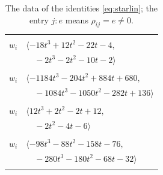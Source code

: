 \documentclass[11pt]{article}
\begin{document}
\begingroup\scriptsize
\setlength{\LTcapwidth}{\textwidth}
\begin{longtable}{@{}ll@{}}
\caption{The data of the identities \eqref{eq:starlin}; the entry $j{:}e$ means $\rho_{ij}=e\neq0$.}\label{tab:star}\\
\hline\endfirsthead\hline\endhead\hline\endfoot
\multicolumn{2}{@{}p{0.97\textwidth}@{}}{$i=0$, $D_i=8$, $\rho_{ij}$: $6{:}1, \allowbreak 7{:}2, \allowbreak 8{:}2, \allowbreak 12{:}2, \allowbreak 13{:}2, \allowbreak 19{:}1, \allowbreak 21{:}1, \allowbreak 27{:}2, \allowbreak 30{:}1, \allowbreak 37{:}2$}\\
$w_i$ & $\langle -18t^{3}+12t^{2}-22t-4,$\\
 & $\quad -2t^{3}-2t^{2}-10t-2\rangle$\\
\addlinespace[2pt]
\multicolumn{2}{@{}p{0.97\textwidth}@{}}{$i=1$, $D_i=32$, $\rho_{ij}$: $3{:}1, \allowbreak 4{:}2, \allowbreak 8{:}2, \allowbreak 9{:}2, \allowbreak 10{:}2, \allowbreak 12{:}2, \allowbreak 17{:}2, \allowbreak 19{:}2, \allowbreak 20{:}1, \allowbreak 29{:}2, \allowbreak 34{:}2, \allowbreak 36{:}2, \allowbreak 37{:}1, \allowbreak 41{:}2, \allowbreak 42{:}1$}\\
$w_i$ & $\langle -1184t^{3}-204t^{2}+884t+680,$\\
 & $\quad -1084t^{3}-1050t^{2}-282t+136\rangle$\\
\addlinespace[2pt]
\multicolumn{2}{@{}p{0.97\textwidth}@{}}{$i=2$, $D_i=4$, $\rho_{ij}$: $4{:}2, \allowbreak 7{:}1, \allowbreak 16{:}1, \allowbreak 17{:}1, \allowbreak 19{:}1, \allowbreak 31{:}1, \allowbreak 34{:}1, \allowbreak 42{:}1, \allowbreak 47{:}1$}\\
$w_i$ & $\langle 12t^{3}+2t^{2}-2t+12,$\\
 & $\quad -2t^{2}-4t-6\rangle$\\
\addlinespace[2pt]
\multicolumn{2}{@{}p{0.97\textwidth}@{}}{$i=3$, $D_i=4$, $\rho_{ij}$: $1{:}2, \allowbreak 10{:}1, \allowbreak 17{:}1, \allowbreak 18{:}2, \allowbreak 19{:}2, \allowbreak 23{:}1, \allowbreak 29{:}1, \allowbreak 36{:}2, \allowbreak 46{:}1$}\\
$w_i$ & $\langle -98t^{3}-88t^{2}-158t-76,$\\
 & $\quad -280t^{3}-180t^{2}-68t-32\rangle$\\
\addlinespace[2pt]
\multicolumn{2}{@{}p{0.97\textwidth}@{}}{$i=4$, $D_i=4$, $\rho_{ij}$: $1{:}1, \allowbreak 2{:}1, \allowbreak 13{:}2, \allowbreak 15{:}1, \allowbreak 22{:}1, \allowbreak 30{:}1, \allowbreak 41{:}2, \allowbreak 42{:}1, \allowbreak 45{:}1$}\\

\end{longtable}
\end{document}

